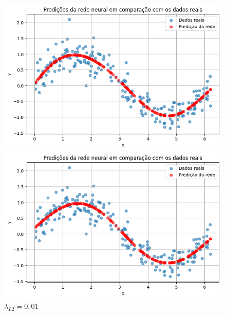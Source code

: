 \begin{figure}[htb]
	\centering
	\begin{minipage}{0.45\textwidth}
		\centering
		\caption{$\lambda_{L2}=0,0$}\label{fig:tarefa06:00:predicoes}
		
		\includegraphics[width=\textwidth]{./0803_imgs/0703_tarefa06/png-241111-193408972-100508130524023774.png}
	\end{minipage}
	\hfill
	\begin{minipage}{0.45\textwidth}
		\centering
		\caption{$\lambda_{L2}=0,001$}\label{fig:tarefa06:0001:predicoes}
		
		\includegraphics[width=\textwidth]{./0803_imgs/0703_tarefa06/png-241111-193433094-6903075368889255079.png}
	\end{minipage}
	\vspace{2Ex}
	\begin{minipage}{0.45\textwidth}
		\centering
		\caption{$\lambda_{L2}=0,01$}\label{fig:tarefa06:001:predicoes}
		

\end{minipage}
\end{figure}
